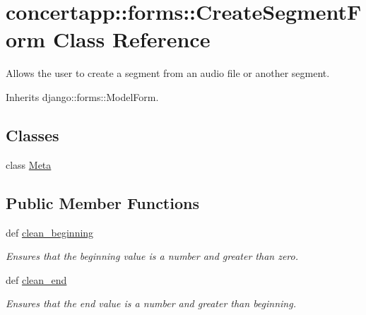 \hypertarget{classconcertapp_1_1forms_1_1_create_segment_form}{
\section{concertapp::forms::CreateSegmentForm Class Reference}
\label{classconcertapp_1_1forms_1_1_create_segment_form}
}


Allows the user to create a segment from an audio file or another segment.  




Inherits django::forms::ModelForm.

\subsection*{Classes}
\begin{DoxyCompactItemize}
\item 
class \hyperlink{classconcertapp_1_1forms_1_1_create_segment_form_1_1_meta}{Meta}
\end{DoxyCompactItemize}
\subsection*{Public Member Functions}
\begin{DoxyCompactItemize}
\item 
def \hyperlink{classconcertapp_1_1forms_1_1_create_segment_form_a9b284ab2b2225bbde865e5144acc0269}{clean\_\-beginning}
\begin{DoxyCompactList}\small\item\em Ensures that the beginning value is a number and greater than zero. \item\end{DoxyCompactList}\item 
def \hyperlink{classconcertapp_1_1forms_1_1_create_segment_form_adee711926c4c3f773583c7a473fd592a}{clean\_\-end}
\begin{DoxyCompactList}\small\item\em Ensures that the end value is a number and greater than beginning. \item\end{DoxyCompactList}\end{DoxyCompactItemize}
